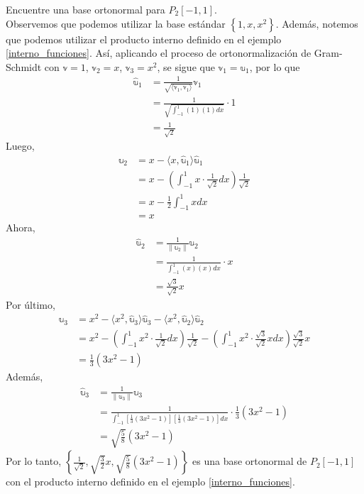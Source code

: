 \begin{example}
    Encuentre una base ortonormal para $P_2[-1, 1]$. \\
    \solucion Observemos que podemos utilizar la base estándar $\left\{ 1, x, x^2 \right\}$. \newpage\noindent Además, notemos que podemos utilizar el producto interno definido en el ejemplo \ref{interno_funciones}. Así, aplicando el proceso de ortonormalización de Gram-Schmidt con $\mathbb{v} = 1$, $\mathbb{v}_2 = x$, $\mathbb{v}_3 = x^2$, se sigue que $\mathbb{v}_1 = \mathbb{u}_1$, por lo que
    \begin{align*}
        \hat{\mathbb{u}}_1 & = \frac{1}{\sqrt{\langle \mathbb{v}_1, \mathbb{v}_1 \rangle}} \mathbb{v}_1 \\
        & = \frac{1}{\sqrt{\displaystyle\int_{-1}^{1} (1)(1) dx}} \cdot 1 \\
        & = \frac{1}{\sqrt{2}}
    \end{align*}
    Luego,
    \begin{align*}
        \mathbb{u}_2 & = x - \langle x, \hat{\mathbb{u}}_1 \rangle \hat{\mathbb{u}}_1 \\
        & = x - \left( \int_{-1}^{1} x \cdot \frac{1}{\sqrt{2}} dx \right) \frac{1}{\sqrt{2}} \\
        & = x - \frac{1}{2} \int_{-1}^{1} x dx \\
        & = x
    \end{align*}
    Ahora,
    \begin{align*}
        \hat{\mathbb{u}}_2 & = \frac{1}{\| \mathbb{u}_2 \|} \mathbb{u}_2 \\
        & = \frac{1}{\displaystyle\int_{-1}^{1} (x)(x) dx} \cdot x \\
        & = \frac{\sqrt{3}}{\sqrt{2}} x
    \end{align*}
    Por último,
    \begin{align*}
        \mathbb{u}_3 & = x^2 - \langle x^2, \hat{\mathbb{u}}_3 \rangle \hat{\mathbb{u}}_3 - \langle x^2, \hat{\mathbb{u}}_2 \rangle \hat{\mathbb{u}}_2 \\
        & = x^2 - \left( \int_{-1}^{1} x^2 \cdot \frac{1}{\sqrt{2}} dx \right) \frac{1}{\sqrt{2}} - \left( \int_{-1}^{1} x^2 \cdot \frac{\sqrt{3}}{\sqrt{2}} x dx \right) \frac{\sqrt{3}}{\sqrt{2}} x \\
        & = \frac{1}{3} \left( 3x^2 - 1 \right)
    \end{align*}
    Además,
    \begin{align*}
        \hat{\mathbb{u}}_3 & = \frac{1}{\| \mathbb{u}_3 \|} \mathbb{u}_3 \\
        & = \frac{1}{\displaystyle\int_{-1}^{1} \left[ \frac{1}{3} \left( 3x^2 - 1 \right) \right] \left[ \frac{1}{3} \left( 3x^2 - 1 \right) \right] dx} \cdot \frac{1}{3} \left( 3x^2 - 1 \right) \\
        & = \sqrt{\frac{5}{8}} \left( 3x^2 - 1 \right)
    \end{align*}
    Por lo tanto, $\displaystyle\left\{ \frac{1}{\sqrt{2}}, \sqrt{\frac{3}{2}} x, \sqrt{\frac{5}{8}} \left( 3x^2 - 1 \right) \right\}$ es una base ortonormal de $P_2[-1, 1]$ con el producto interno definido en el ejemplo \ref{interno_funciones}.
\end{example}

